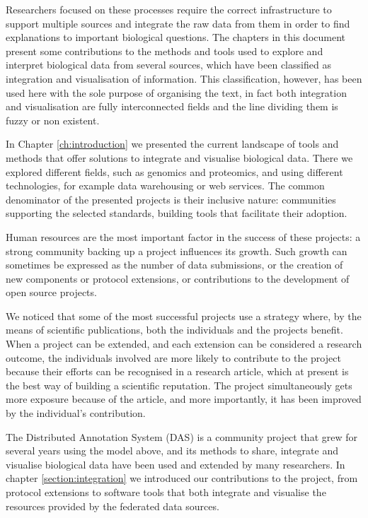Researchers focused on these processes require the correct infrastructure to support multiple sources and integrate the raw data from them in order to find explanations to important biological questions. The chapters in this document present some contributions to the methods and tools used to explore and interpret biological data from several sources, which have been classified as integration and visualisation of information. This classification, however, has been used here with the sole purpose of organising the text, in fact both integration and visualisation are fully interconnected fields and the line dividing them is fuzzy or non existent.

\vspace{5mm}

In Chapter \ref{ch:introduction} we presented the current landscape of tools and methods that offer solutions to integrate and visualise biological data. There we explored different fields, such as genomics and proteomics, and using different technologies, for example data warehousing or web services. The common denominator of the presented projects is their inclusive nature: communities supporting the selected standards, building tools that facilitate their adoption. 

Human resources are the most important factor in the success of these projects: a strong community backing up a project influences its growth. Such growth can sometimes be expressed as the number of data submissions, or the creation of new components or protocol extensions, or contributions to the development of open source projects.

We noticed that some of the most successful projects use a strategy where, by the means of scientific publications, both the individuals and the projects  benefit. When a project can be extended, and each extension can be considered a research outcome, the individuals involved are more likely to contribute to the project because their efforts can be recognised in a research article, which at present is the best way of building a scientific reputation. The project simultaneously gets more exposure because of the article, and more importantly, it has been improved by the individual's contribution.

\vspace{5mm}

The Distributed Annotation System (DAS) is a community project that grew for several years using the model above, and its methods to share, integrate and visualise biological data have been used and extended by many researchers. In chapter \ref{section:integration} we introduced our contributions to the project, from protocol extensions to software tools that both integrate and visualise the resources provided by the federated data sources.

